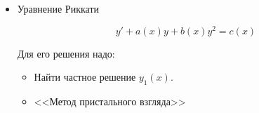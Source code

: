 \documentclass[a4paper, 14pt]{article}
\newcommand{\dx}{\mathrm{d}x}
\newcommand{\dv}[2]{%
  \ifstrempty{#2}%
    {\mathrm{d}#1}%
    {\frac{\mathrm{d}#1}{\mathrm{d}#2}}%
}
\theoremstyle{definition}
\newtheorem*{example}{Пример}
\newenvironment{answer}
  {\par\noindent\textbf{Ответ:}}
  {\par}
\begin{document}
\begin{itemize}
\begin{example}
    Решить пример $xy'-2x^2\sqrt{y} = 4y$.

    Разделим на $\sqrt{y}$, причём $y=0$ - решение.

    \[\frac{xy'}{\sqrt{y}}- 2x^2 = 4\sqrt{y}\]

    Замена $z = \sqrt{y}, \quad z' = \frac{y'}{2\sqrt{y}}$
    
    \[2xz' - 2x^2 = 4z \quad |\cdot\frac{1}{2}\]

    \[xz' - x^2 = z\]
    \[xz' -2z = x^2\]

    Решаем однородное $xz' -2z = 0$

    \[xz' -2z = 0\]
    
    \[xz' = 2z\]
    
    \[x\frac{\dv{z}{}}{\dx} = 2z\]
    
    \[\int{\frac{\dv{z}{}}{z}}=2\int{\frac{\dx}{x}}\]
    
    \[\ln|z| = 2\ln|x|+\ln{C}\]
    
    \[z=Cx^2\]
    
    \[z'=C'x^2+2Cx\]
    
     Подставляем получившиеся $z$ и $z'$ в исходное уравнение $xz' -2z = x^2$.

     \[C'x^3+2Cx^2-x^2=2Cx^2\]

     \[C'x^3=x^2\]

     \[C'=\frac{1}{x}\]

     \[C=\ln{\tilde{C}x}\]
     
     Подставляем $C$ в решение однородного уравнения.

     \[z = x^2\ln(Cx)\]

     Обратная замена: $y = z^2$

     \[y = x^4\ln^2(Cx)\]
    
\end{example}
\begin{answer}
    $y = x^4\ln^2(Cx); \quad y=0$
\end{answer}


\item \textbf{}Уравнение Риккати

\[y' + a(x)y + b(x)y^2 = c(x)\]

Для его решения надо:

\begin{itemize}
        \item[\scriptsize\textbullet] Найти частное решение $y_1(x)$.
        \item[\scriptsize\textbullet]<<Метод пристального взгляда>>


\end{itemize}
\end{itemize}
\end{document}
